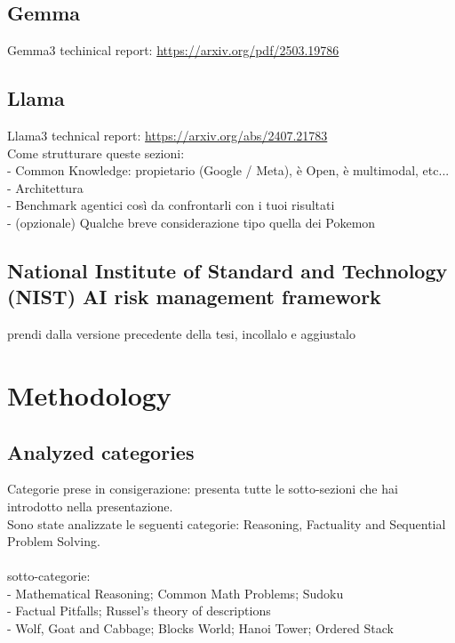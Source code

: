 \documentclass[12pt]{article}
\begin{document}
    \subsection{Gemma}

Gemma3 techinical report: \url{https://arxiv.org/pdf/2503.19786}\\

    \subsection{Llama}
        
Llama3 technical report: \url{https://arxiv.org/abs/2407.21783}\\


Come strutturare queste sezioni:\\
- Common Knowledge: propietario (Google / Meta), è Open, è multimodal, etc...\\
- Architettura\\
- Benchmark agentici così da confrontarli con i tuoi risultati\\
- (opzionale) Qualche breve considerazione tipo quella dei Pokemon\\
    
    \subsection{National Institute of Standard and Technology (NIST) AI risk management framework}
    prendi dalla versione precedente della tesi, incollalo e aggiustalo

     
     
\clearpage
\section{Methodology}
    \subsection{Analyzed categories}
    Categorie prese in consigerazione: presenta tutte le sotto-sezioni che hai introdotto nella presentazione.\\
    Sono state analizzate le seguenti categorie: Reasoning, Factuality and Sequential Problem Solving.\\
    \\
    sotto-categorie:\\
    - Mathematical Reasoning; Common Math Problems; Sudoku\\
    - Factual Pitfalls; Russel’s theory of descriptions\\
    - Wolf, Goat and Cabbage; Blocks World; Hanoi Tower; Ordered Stack\\
    
\end{document}
